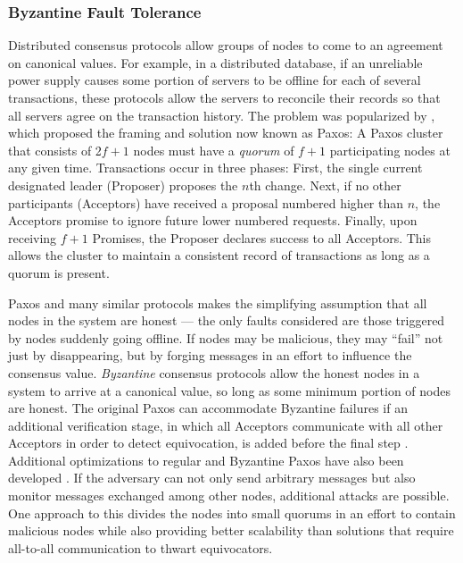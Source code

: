   \subsubsection{Byzantine Fault Tolerance}
    Distributed consensus protocols allow groups of nodes to come to an
    agreement on canonical values. For example, in a distributed database, if an
    unreliable power supply causes some portion of servers to be offline for
    each of several transactions, these protocols allow the
    servers to reconcile their records so that all servers agree on the
    transaction history. The problem was popularized by
    \cite{paxos}, which proposed the framing and solution now
    known as Paxos: A Paxos cluster that consists of 2$f+1$ nodes must have a
    \emph{quorum} of $f + 1$ participating nodes at any given time.
    Transactions occur in three phases: First, the single current designated
    leader (Proposer) proposes the $n$th change. Next, if no other participants
    (Acceptors) have received a proposal numbered higher than $n$, the Acceptors
    promise to ignore future lower numbered requests.  Finally, upon receiving
    $f+1$ Promises, the Proposer declares success to all Acceptors. This allows
    the cluster to maintain a consistent record of transactions as long as a
    quorum is present.

    Paxos and many similar protocols makes the simplifying assumption that all
    nodes in the system are honest --- the only faults considered are those
    triggered by nodes suddenly going offline. If nodes may be malicious, they
    may ``fail'' not just by disappearing, but by forging messages in an effort
    to influence the consensus value. \emph{Byzantine} consensus protocols allow
    the honest nodes in a system to arrive at a canonical value, so long as some
    minimum portion of nodes are honest. The original Paxos can
    accommodate Byzantine failures if an additional verification stage, in which
    all Acceptors communicate with all other Acceptors in order to detect
    equivocation, is added before the final step \cite{castro_practical_1999}.
    Additional optimizations to regular and Byzantine Paxos have also been
    developed \cite{lamport_fast_2006}. If the adversary can not only send
    arbitrary messages but also monitor messages exchanged among other nodes,
    additional attacks are possible. One approach to this divides the nodes into
    small quorums in an effort to contain malicious nodes \cite{king_load_2011}
    while also providing better scalability than solutions that require
    all-to-all communication to thwart equivocators.


